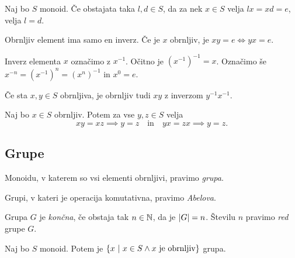 \begin{trditev}
Naj bo $S$ monoid. Če obstajata taka $l,d\in S$, da za nek $x\in S$ velja $lx=xd=e$, velja $l=d$.
\end{trditev}

\obvs

\begin{posledica}
Obrnljiv element ima samo en inverz. Če je $x$ obrnljiv, je $xy=e\iff yx=e$.
\end{posledica}

\begin{opomba}
Inverz elementa $x$ označimo z $x^{-1}$. Očitno je $(x^{-1})^{-1}=x$. Označimo še $x^{-n}=(x^{-1})^n=(x^n)^{-1}$ in $x^0=e$.
\end{opomba}

\begin{trditev}
Če sta $x,y\in S$ obrnljiva, je obrnljiv tudi $xy$ z inverzom $y^{-1}x^{-1}$.
\end{trditev}

\obvs

\begin{trditev}
Naj bo $x\in S$ obrnljiv. Potem za vse $y,z\in S$ velja
\[
xy=xz\implies y=z\quad\text{in}\quad yx=zx\implies y=z.
\]
\end{trditev}

\obvs

\newpage

\subsection{Grupe}

\begin{definicija}
Monoidu, v katerem so vsi elementi obrnljivi, pravimo \emph{grupa}.
\end{definicija}

\begin{definicija}
Grupi, v kateri je operacija komutativna, pravimo \emph{Abelova}.
\end{definicija}

\begin{definicija}
Grupa $G$ je \emph{končna}, če obstaja tak $n\in\mathbb{N}$, da je $\left\lvert G\right\rvert=n$. Številu $n$ pravimo \emph{red} grupe $G$.
\end{definicija}

\begin{trditev}
Naj bo $S$ monoid. Potem je $\left\{x~\middle\vert~x\in S\land\text{$x$ je obrnljiv}\right\}$ grupa.
\end{trditev}

